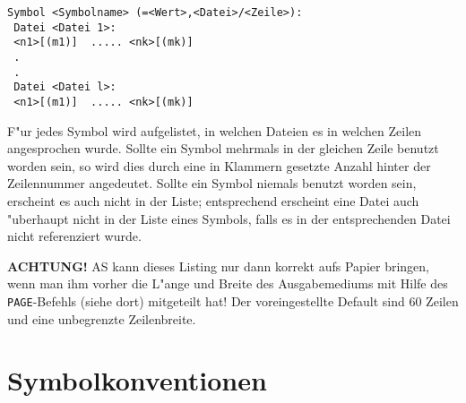 \documentclass[12pt,a4paper,twoside]{report}
\newcommand{\bb}[1]{{\bf #1}}
\newcommand{\tty}[1]{{\tt #1}}
\begin{document}
\begin{verbatim}
Symbol <Symbolname> (=<Wert>,<Datei>/<Zeile>):
 Datei <Datei 1>:
 <n1>[(m1)]  ..... <nk>[(mk)]
 .
 .
 Datei <Datei l>:
 <n1>[(m1)]  ..... <nk>[(mk)]
\end{verbatim}
F"ur jedes Symbol wird aufgelistet, in welchen Dateien es in welchen Zeilen
angesprochen wurde.  Sollte ein Symbol mehrmals in der gleichen Zeile
benutzt worden sein, so wird dies durch eine in Klammern gesetzte Anzahl
hinter der Zeilennummer angedeutet.  Sollte ein Symbol niemals benutzt
worden sein, erscheint es auch nicht in der Liste; entsprechend erscheint
eine Datei auch "uberhaupt nicht in der Liste eines Symbols, falls es in
der entsprechenden Datei nicht referenziert wurde.
\par
\bb{ACHTUNG!} AS kann dieses Listing nur dann korrekt aufs Papier bringen,
wenn man ihm vorher die L"ange und Breite des Ausgabemediums mit Hilfe des
\tty{PAGE}-Befehls (siehe dort) mitgeteilt hat!  Der voreingestellte
Default sind 60 Zeilen und eine unbegrenzte Zeilenbreite.


\section{Symbolkonventionen}
\label{SectSymConv}
\end{document}
